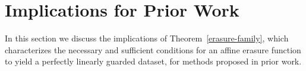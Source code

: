 \documentclass{article}
\theoremstyle{plain}
\theoremstyle{remark}
\newcommand{\E}{\mathbb E}
\theoremstyle{plain}
\theoremstyle{TheoremNum}
\newcommand{\rv}[1]{{\mathrm{#1}}}
\begin{document}
%

\section{Implications for Prior Work}
\label{app:prior-work-optimality}

In this section we discuss the implications of Theorem~\ref{erasure-family}, which characterizes the necessary and sufficient conditions for an affine erasure function to yield a perfectly linearly guarded dataset, for methods proposed in prior work.
\end{document}
